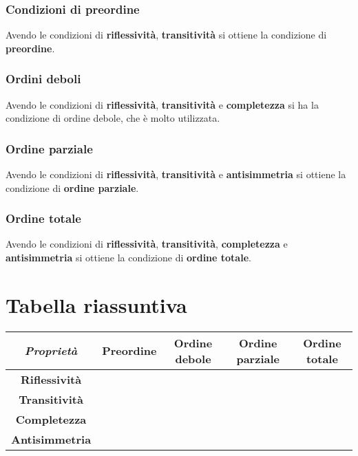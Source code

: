 \documentclass[\main/main.tex]{subfiles}
\begin{document}
\subsubsection{Condizioni di preordine}
Avendo le condizioni di \textbf{riflessività}, \textbf{transitività} si ottiene la condizione di \textbf{preordine}.

\subsubsection{Ordini deboli}
Avendo le condizioni di \textbf{riflessività}, \textbf{transitività} e \textbf{completezza} si ha la condizione di ordine debole, che è molto utilizzata.

\subsubsection{Ordine parziale}
Avendo le condizioni di \textbf{riflessività}, \textbf{transitività} e \textbf{antisimmetria} si ottiene la condizione di \textbf{ordine parziale}.

\subsubsection{Ordine totale}
Avendo le condizioni di \textbf{riflessività}, \textbf{transitività}, \textbf{completezza} e \textbf{antisimmetria} si ottiene la condizione di \textbf{ordine totale}.

\section{Tabella riassuntiva}
\begin{center}
	\begin{tabular}{|c|c|c|c|c|}
		\hline
		\textit{Proprietà}     & \textbf{Preordine} & \textbf{Ordine debole} & \textbf{Ordine parziale} & \textbf{Ordine totale} \\
		\hline
		\textbf{Riflessività}  & \checkmark         & \checkmark             & \checkmark               & \checkmark             \\
		\hline
		\textbf{Transitività}  & \checkmark         & \checkmark             & \checkmark               & \checkmark             \\
		\hline
		\textbf{Completezza}   &                    & \checkmark             &                          & \checkmark             \\
		\hline
		\textbf{Antisimmetria} &                    &                        & \checkmark               & \checkmark             \\
		\hline
	\end{tabular}
\end{center}
\end{document}

